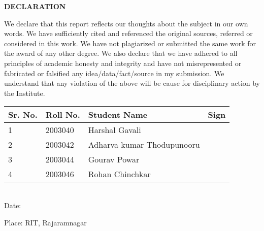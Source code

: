  \setcounter{page}{3}
\begin{center}
{\large \bf DECLARATION}
\end{center}
\normalfont
\vspace{0.5cm}
\noindent
We declare that this report reflects our thoughts about the subject in our own words. We have sufficiently cited and referenced the original sources, referred or considered in this  work. We have not plagiarized or submitted the same work for the award of any other degree. We also declare that we have adhered to all principles of academic honesty and integrity and have not misrepresented or fabricated or falsified any idea/data/fact/source in my submission. We understand that any violation of the above will be cause for disciplinary action by the Institute.


\vspace{3cm}


  \begin{tabular}{|p{2cm}|p{3cm}|l|p{3cm}|}
    \hline
    \textbf{Sr. No.} & \textbf{Roll No.} & \textbf{Student Name} & \textbf{Sign} \\
    \hline
    1 & 2003040 & Harshal Gavali & \\
    \hline
    2 & 2003042 & Adharva kumar Thodupunooru & \\
    \hline
    3 & 2003044 & Gourav Powar & \\
    \hline
    4 & 2003046 & Rohan Chinchkar & \\
    \hline
  \end{tabular}





\vspace{6cm}
\\

Date:

Place: RIT, Rajaramnagar

\clearpage